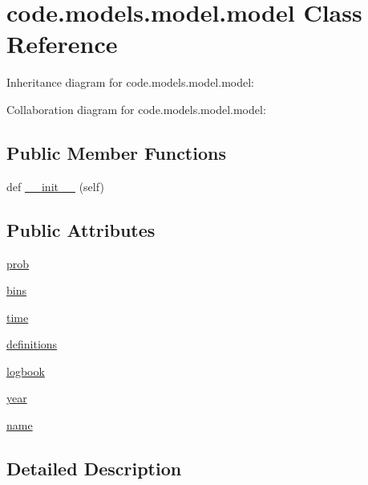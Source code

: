 \hypertarget{classcode_1_1models_1_1model_1_1model}{}\section{code.\+models.\+model.\+model Class Reference}
\label{classcode_1_1models_1_1model_1_1model}


Inheritance diagram for code.\+models.\+model.\+model\+:


Collaboration diagram for code.\+models.\+model.\+model\+:
\subsection*{Public Member Functions}
\begin{DoxyCompactItemize}
\item 
def \hyperlink{classcode_1_1models_1_1model_1_1model_a57f300b026088203a74fc7eb093d1ce8}{\+\_\+\+\_\+init\+\_\+\+\_\+} (self)
\end{DoxyCompactItemize}
\subsection*{Public Attributes}
\begin{DoxyCompactItemize}
\item 
\hyperlink{classcode_1_1models_1_1model_1_1model_ae0c16904c5fd80cd92fb5466f0ea5ab5}{prob}
\item 
\hyperlink{classcode_1_1models_1_1model_1_1model_a848482cacf97b2087e82ca4004af20b3}{bins}
\item 
\hyperlink{classcode_1_1models_1_1model_1_1model_ad6a5095c00c3d7cf0d61d3f028db0ce0}{time}
\item 
\hyperlink{classcode_1_1models_1_1model_1_1model_a3ce7471348562b088db1143e57f9acc3}{definitions}
\item 
\hyperlink{classcode_1_1models_1_1model_1_1model_a1475e43d95e81a0d425eeade8e65f9f7}{logbook}
\item 
\hyperlink{classcode_1_1models_1_1model_1_1model_ac9619b942cec2ddaa57336fbb3805d21}{year}
\item 
\hyperlink{classcode_1_1models_1_1model_1_1model_af418480b08edd0862b53ec51ee3afe06}{name}
\end{DoxyCompactItemize}


\subsection{Detailed Description}


